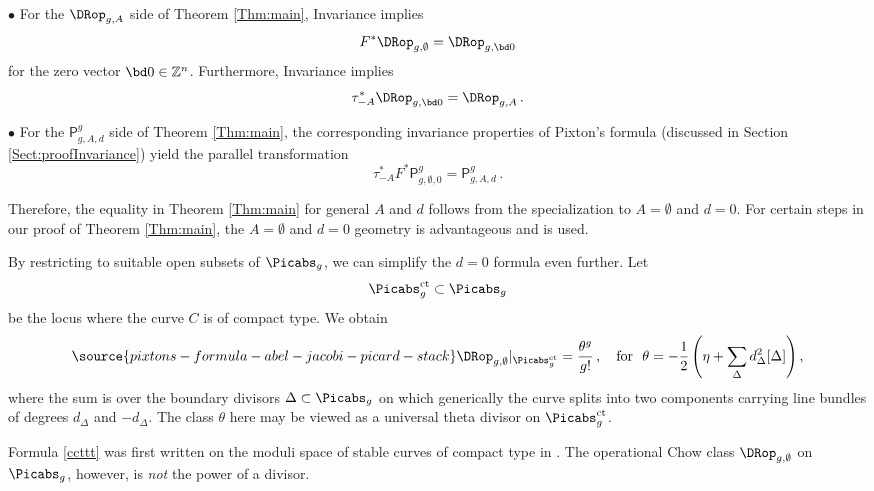  $\bullet$
For the $\DRop_{g,A}$ side of Theorem \ref{Thm:main},
Invariance \invnrn{}
implies $$F^* \DRop_{g,\emptyset} = \DRop_{g,\bd 0}$$ for the zero vector $\bd 0 \in \mathbb{Z}^n$. Furthermore, Invariance \invnrA{} implies $$\tau_{-A}^*\DRop_{g,\bd 0} = \DRop_{g,A}\, .$$


 $\bullet$ For the $\mathsf{P}^g_{g,A,d}$
side of Theorem \ref{Thm:main},
the corresponding invariance properties of Pixton's formula
(discussed in Section \ref{Sect:proofInvariance})
yield the parallel transformation
$$\tau_{-A}^*F^*\mathsf{P}^g_{g,\emptyset,0} = \mathsf{P}^g_{g,A,d}\, .$$


 Therefore, the equality in Theorem \ref{Thm:main} for general $A$ and $d$ follows from the specialization to $A=\emptyset$ and $d=0$.
For certain steps in our proof of Theorem \ref{Thm:main}, the
$A=\emptyset$ and $d=0$
geometry is
advantageous and is used.


By restricting to suitable open subsets of $\Picabs_{g}$, we can simplify the $d=0$ formula even further. Let $$\Picabs_{g}^\textup{ct} \subset \Picabs_{g}$$
be the locus where the curve $C$ is of compact type.
We obtain
\begin{equation}\label{ccttt}
\source{pixtons-formula-abel-jacobi-picard-stack}
 \DRop_{g,\emptyset}|_{\Picabs_{g}^\textup{ct}}
 = \frac{\theta^g}{g!} \,, \ \ \
 \text{for}\ \ \theta = -\frac12 \left(\eta +  \sum_{\Delta} d_\Delta^2 [\Delta] \right),
\end{equation}
where the sum is over the boundary divisors $\Delta \subset \Picabs_g$ on which generically the curve splits into two components carrying line bundles of degrees $d_\Delta$ and $-d_\Delta$.
The class $\theta$ here may be viewed as a universal theta divisor on $\Picabs_{g}^\textup{ct}$.

Formula \eqref{ccttt} was first written on the moduli space of stable curves of compact type in
\cite{Grushevsky2012The-double-rami,Hain2013Normal-function}. The operational Chow class  $\DRop_{g,\emptyset}$ on $\Picabs_g$,
however, is {\em not} the  power of a divisor.







